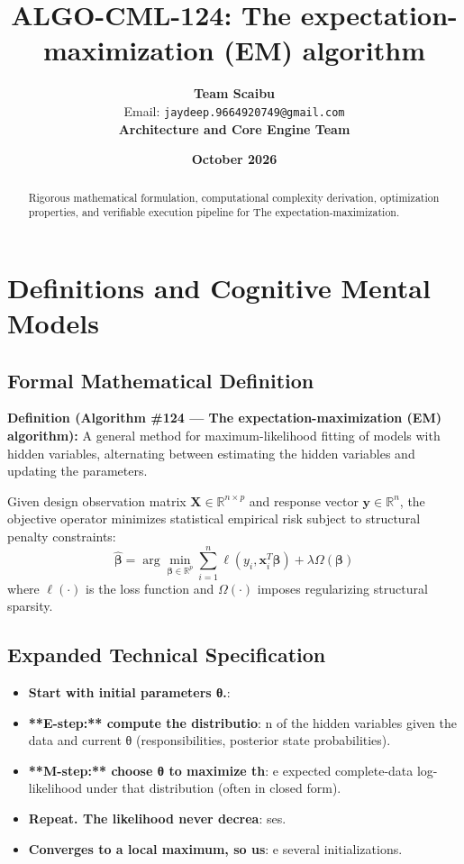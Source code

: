 \documentclass[11pt,a4paper]{article}
\title{\textbf{ALGO-CML-124: The expectation-maximization (EM) algorithm}}
\author{\textbf{Team Scaibu} \\ \small Email: \texttt{jaydeep.9664920749@gmail.com} \\ \small \textbf{Architecture and Core Engine Team}}
\date{\textbf{October 2026}}
\theoremstyle{definition}
\begin{document}
\maketitle

\begin{abstract}
Rigorous mathematical formulation, computational complexity derivation, optimization properties, and verifiable execution pipeline for The expectation-maximization.
\end{abstract}

\section{Definitions and Cognitive Mental Models}

\subsection{Formal Mathematical Definition}
\textbf{Definition (Algorithm \#124 --- The expectation-maximization (EM) algorithm):}
A general method for maximum-likelihood fitting of models with hidden variables, alternating between estimating the hidden variables and updating the parameters.

Given design observation matrix $\mathbf{X} \in \mathbb{R}^{n \times p}$ and response vector $\mathbf{y} \in \mathbb{R}^n$, the objective operator minimizes statistical empirical risk subject to structural penalty constraints:
\begin{equation}
\hat{\boldsymbol{\beta}} = \arg\min_{\boldsymbol{\beta} \in \mathbb{R}^p} \sum_{i=1}^n \ell(y_i, \mathbf{x}_i^T \boldsymbol{\beta}) + \lambda \Omega(\boldsymbol{\beta})
\end{equation}
where $\ell(\cdot)$ is the loss function and $\Omega(\cdot)$ imposes regularizing structural sparsity.

\subsection{Expanded Technical Specification}
\begin{itemize}
\item \textbf{Start with initial parameters θ.}: 
\item \textbf{**E-step:** compute the distributio}: n of the hidden variables given the data and current θ (responsibilities, posterior state probabilities).
\item \textbf{**M-step:** choose θ to maximize th}: e expected complete-data log-likelihood under that distribution (often in closed form).
\item \textbf{Repeat. The likelihood never decrea}: ses.
\item \textbf{Converges to a local maximum, so us}: e several initializations.
\end{itemize}
\end{document}
